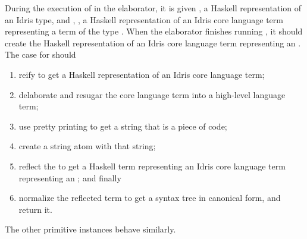 During the execution of  in the elaborator, it is given
, a Haskell representation of an Idris type, and ,
, a Haskell representation of an Idris core language term representing
a term of the type .
When the elaborator finishes running , it should create
the Haskell representation of an Idris core language term representing an
\sexp{}. The \TT{} case for  should

\begin{enumerate}
  \item reify  to get a Haskell representation of an Idris core language term;
  \item delaborate and resugar the core language term into a high-level language term;
  \item use pretty printing to get a string that is a piece of code;
  \item create a string atom \sexp{} with that string;
  \item reflect the \sexp{} to get a Haskell term representing an Idris core language term representing an \sexp{}; and finally
  \item normalize the reflected term to get a syntax tree in canonical form, and return it.
\end{enumerate}

\noindent
The other primitive instances behave similarly.

